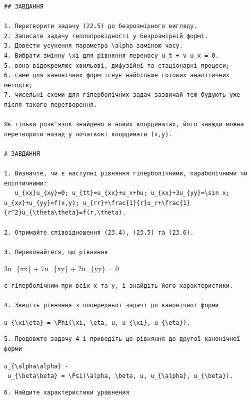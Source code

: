 \documentclass[
  ukrainian,
]{article}
\begin{document}
\begin{verbatim}
## ЗАВДАННЯ

1. Перетворити задачу (22.5) до безрозмірного вигляду.
2. Записати задачу теплопровідності у безрозмірній формі.
3. Довести усунення параметра \alpha заміною часу.
4. Вибрати змінну \xi для рівняння переносу u_t + v u_x = 0.
5. вона відокремлює хвильові, дифузійні та стаціонарні процеси;
6. саме для канонічних форм існує найбільше готових аналітичних методів;
7. чисельні схеми для гіперболічних задач зазвичай теж будують уже після такого перетворення.

Як тільки розв'язок знайдено в нових координатах, його завжди можна перетворити назад у початкові координати (x,y).

# ЗАВДАННЯ

1. Визначте, чи є наступні рівняння гіперболічними, параболічними чи еліптичними:
   u_{xx}u_{xy}=0; u_{tt}=u_{xx}+u_x+hu; u_{xx}+3u_{yy}=\sin x; u_{xx}+u_{yy}=f(x,y); u_{rr}+\frac{1}{r}u_r+\frac{1}{r^2}u_{\theta\theta}=f(r,\theta).

2. Отримайте співвідношення (23.4), (23.5) та (23.6).

3. Переконайтеся, що рівняння
\end{verbatim}

3u\_\{xx\} + 7u\_\{xy\} + 2u\_\{yy\} = 0

\begin{verbatim}
є гіперболічним при всіх x та y, і знайдіть його характеристики.

4. Зведіть рівняння з попередньої задачі до канонічної форми
\end{verbatim}

\texttt{u\_\{\textbackslash{}xi\textbackslash{}eta\}\ =\ \textbackslash{}Phi(\textbackslash{}xi,\ \textbackslash{}eta,\ u,\ u\_\{\textbackslash{}xi\},\ u\_\{\textbackslash{}eta\}).}

\begin{verbatim}
5. Продовжте задачу 4 і приведіть це рівняння до другої канонічної форми
\end{verbatim}

\texttt{u\_\{\textbackslash{}alpha\textbackslash{}alpha\}\ -\ u\_\{\textbackslash{}beta\textbackslash{}beta\}\ =\ \textbackslash{}Psi(\textbackslash{}alpha,\ \textbackslash{}beta,\ u,\ u\_\{\textbackslash{}alpha\},\ u\_\{\textbackslash{}beta\}).}

\begin{verbatim}
6. Найдите характеристики уравнения
\end{verbatim}
\end{document}
